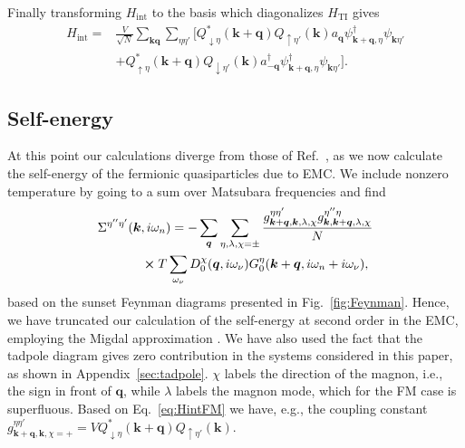 \documentclass[aps, prb, twocolumn,amsmath,amssymb,floatfix]{revtex4-2}
\begin{document}
Finally transforming $H_{\textrm{int}}$ to the basis which diagonalizes $H_{\textrm{TI}}$ gives
\begin{align}
\label{eq:HintFM}
        H_{\textrm{int}} =& \frac{V}{\sqrt{N}} \sum_{\boldsymbol{k} \boldsymbol{q}}\sum_{\eta\eta'} \big[  Q_{\downarrow \eta}^* (\boldsymbol{k}+\boldsymbol{q}) Q_{\uparrow \eta'}(\boldsymbol{k})  a_{\boldsymbol{q}} \psi_{\boldsymbol{k}+\boldsymbol{q}, \eta}^\dagger \psi_{\boldsymbol{k}\eta'}  \nonumber \\
        &+ Q_{\uparrow \eta}^* (\boldsymbol{k}+\boldsymbol{q}) Q_{\downarrow \eta'}(\boldsymbol{k})  a_{-\boldsymbol{q}}^\dagger\psi_{\boldsymbol{k}+\boldsymbol{q}, \eta}^\dagger \psi_{\boldsymbol{k}\eta'} \big].
\end{align}

\subsection{Self-energy}
At this point our calculations diverge from those of Ref.~\cite{EirikTIFMAFM}, as we now calculate the self-energy of the fermionic quasiparticles due to EMC.
We include nonzero temperature by going to a sum over Matsubara frequencies and find \cite{BruusFlensberg, abrikosov, mahanMatsubara, GiraudEgger, elphcselfenergyprb, elphcselfenergyprlpark, elphcselfenergyprltse}
\begin{align}
\label{eq:sigma}
    \Sigma^{\eta''\eta'}(\boldsymbol{k}&, i\omega_n) = - \sum_{\boldsymbol{q}}\sum_{\eta, \lambda, \chi = \pm} \frac{g_{\boldsymbol{k}+\boldsymbol{q}, \boldsymbol{k}, \lambda, \chi}^{\eta\eta'} g_{\boldsymbol{k}, \boldsymbol{k}+\boldsymbol{q}, \lambda, \chi}^{\eta''\eta}}{N} \nonumber \\ 
    &\cross T\sum_{\omega_\nu} D_0^\chi(\boldsymbol{q},i\omega_\nu)G_0^\eta(\boldsymbol{k}+\boldsymbol{q}, i\omega_n+i\omega_\nu),
\end{align}
based on the sunset Feynman diagrams presented in Fig.~\ref{fig:Feynman}. Hence, we have truncated our calculation of the self-energy at second order in the EMC, employing the Migdal approximation \cite{migdal, elphcselfenergyprlpark}. We have also used the fact that the tadpole diagram gives zero contribution in the systems considered in this paper, as shown in Appendix~\ref{sec:tadpole}. $\chi$ labels the direction of the magnon, i.e., the sign in front of $\boldsymbol{q}$, 
while $\lambda$ labels the magnon mode, which for the FM case is superfluous. Based on Eq.~\eqref{eq:HintFM} we have, e.g., the coupling constant $g_{\boldsymbol{k}+\boldsymbol{q}, \boldsymbol{k}, \chi = +}^{\eta\eta'} = V Q_{\downarrow \eta}^*(\boldsymbol{k}+\boldsymbol{q}) Q_{\uparrow \eta'}(\boldsymbol{k})$.
\end{document}
